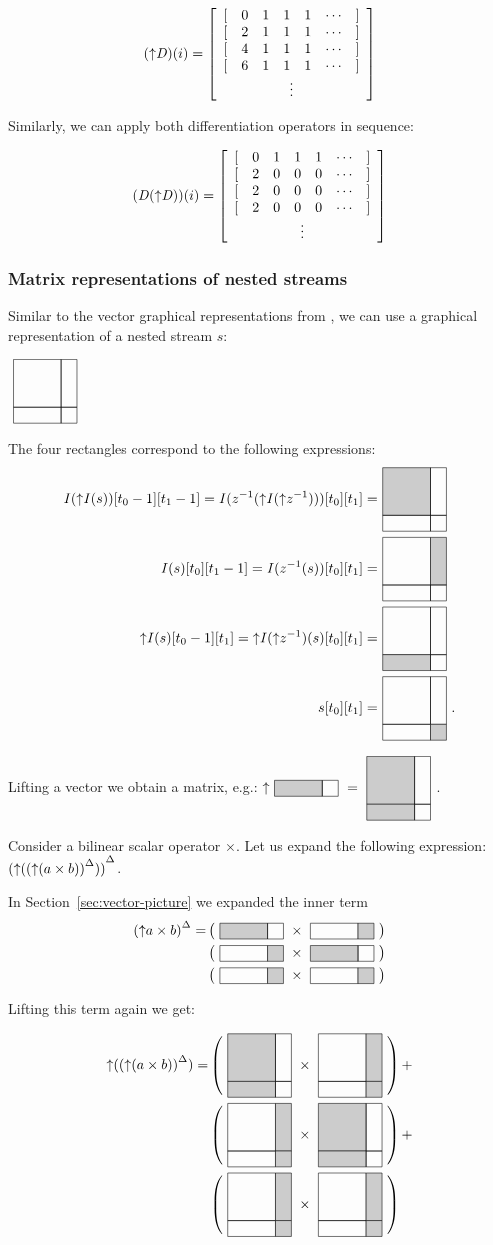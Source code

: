 $$(\lift{\D})(i) = \ssa{0 1 1 1 2 1 1 1 4 1 1 1 6 1 1 1}$$

Similarly, we can apply both differentiation operators in sequence:

$$(\D(\lift{\D}))(i) = \ssa{0 1 1 1 2 0 0 0 2 0 0 0 2 0 0 0}$$

\subsubsection{Matrix representations of nested streams}\label{sec:matrix-picture}

Similar to the vector graphical representations from ,
we can use a graphical representation of a nested stream $s$:

$\mtrx{0 0 0 0}$

The four rectangles correspond to the following expressions: 
$$
\begin{aligned}
\I(\lift{\I}(s))[t_0-1][t_1-1] = \I(\zm(\lift{\I}(\lift{\zm})))[t_0][t_1] =& \mtrx{1 0 0 0} \\
\I(s)[t_0][t_1-1] = \I(\zm(s))[t_0][t_1] =& \mtrx{0 1 0 0} \\
\lift{\I(s)}[t_0-1][t_1] = \lift{\I(\lift{\zm})}(s)[t_0][t_1] =& \mtrx{0 0 1 0} \\
s[t_0][t_1] =& \mtrx{0 0 0 1}.
\end{aligned}
$$

Lifting a vector we obtain a matrix, e.g.:
$\lift{\strm{1 0}} = \mtrx{1 0 1 0}$. 

Consider a bilinear scalar operator $\times$.  Let us expand the following expression:
${({\uparrow}({({\uparrow}(a \times b))}^{\Delta}))}^{\Delta}$.

In Section~\ref{sec:vector-picture} we expanded the inner term
$$
\begin{aligned}
\inc{(\lift{a \times b})} = &\matmult{\strm{1 0}}{\strm{0 1}} \\ 
&\matmult{\strm{0 1}}{\strm{1 0}} \\
&\matmult{\strm{0 1}}{\strm{0 1}}
\end{aligned}
$$

Lifting this term again we get:

$$
\begin{aligned}
\lift{(\inc{(\lift{(a \times b)})})} =& 
\matmult{\mtrx{1 0 1 0}}{\mtrx{0 1 0 1}} +\\ 
&\matmult{\mtrx{0 1 0 1}}{\mtrx{1 0 1 0}} +\\
&\matmult{\mtrx{0 1 0 1}}{\mtrx{0 1 0 1}}
\end{aligned}
$$


